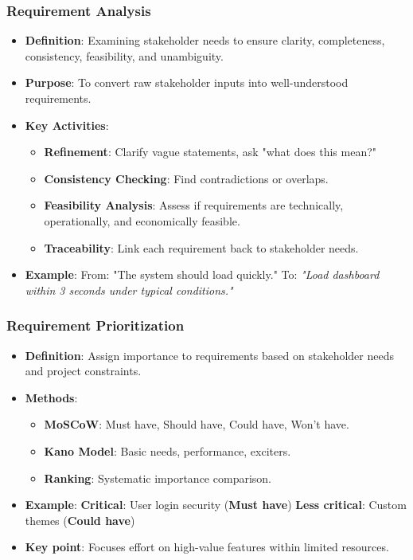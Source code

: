 \documentclass{beamer}
\begin{document}
\begin{frame}[fragile]
    \frametitle{Requirement Analysis}
    \begin{itemize}
        \item \textbf{Definition}: Examining stakeholder needs to ensure clarity, completeness, consistency, feasibility, and unambiguity.
        \item \textbf{Purpose}: To convert raw stakeholder inputs into well-understood requirements.
        \item \textbf{Key Activities}:
        \begin{itemize}
            \item \textbf{Refinement}: Clarify vague statements, ask "what does this mean?"
            \item \textbf{Consistency Checking}: Find contradictions or overlaps.
            \item \textbf{Feasibility Analysis}: Assess if requirements are technically, operationally, and economically feasible.
            \item \textbf{Traceability}: Link each requirement back to stakeholder needs.
        \end{itemize}
        \item \textbf{Example}:  
        \newline
        From: "The system should load quickly."  
        To: \textit{"Load dashboard within 3 seconds under typical conditions."}
    \end{itemize}
\end{frame}

\begin{frame}[fragile]
    \frametitle{Requirement Prioritization}
    \begin{itemize}
        \item \textbf{Definition}: Assign importance to requirements based on stakeholder needs and project constraints.
        \item \textbf{Methods}:
        \begin{itemize}
            \item \textbf{MoSCoW}: Must have, Should have, Could have, Won’t have.
            \item \textbf{Kano Model}: Basic needs, performance, exciters.
            \item \textbf{Ranking}: Systematic importance comparison.
        \end{itemize}
        \item \textbf{Example}:  
        \newline
        \textbf{Critical}: User login security (\textbf{Must have})  
        \textbf{Less critical}: Custom themes (\textbf{Could have})
        \item \textbf{Key point}: Focuses effort on high-value features within limited resources.
    \end{itemize}
\end{frame}
\end{document}
